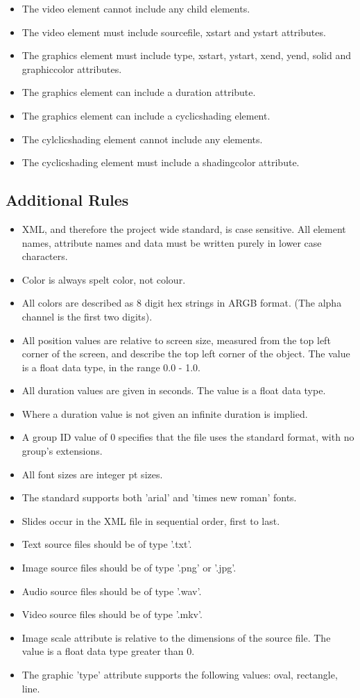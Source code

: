 \documentclass{article}
\begin{document}
\begin{itemize}
\item The video element cannot include any child elements.
\item The video element must include sourcefile, xstart and ystart attributes.
\item The graphics element must include type, xstart, ystart, xend, yend, solid and graphiccolor attributes.
\item The graphics element can include a duration attribute.
\item The graphics element can include a cyclicshading element.
\item The cylclicshading element cannot include any elements.
\item The cyclicshading element must include a shadingcolor attribute.

\end{itemize}

\clearpage

\subsection{Additional Rules}
\begin{itemize}
\item XML, and therefore the project wide standard, is case sensitive. All element names, attribute names and data must be written purely in lower case characters.
\item Color is always spelt color, not colour.
\item All colors are described as 8 digit hex strings in ARGB format. (The alpha channel is the first two digits).
\item All position values are relative to screen size, measured from the top left corner of the screen, and describe the top left corner of the object. The value is a float data type, in the range 0.0 - 1.0.
\item All duration values are given in seconds. The value is a float data type.
\item Where a duration value is not given an infinite duration is implied.
\item A group ID value of 0 specifies that the file uses the standard format, with no group's extensions.
\item All font sizes are integer pt sizes.
\item The standard supports both 'arial' and 'times new roman' fonts.
\item Slides occur in the XML file in sequential order, first to last.
\item Text source files should be of type '.txt'.
\item Image source files should be of type '.png' or '.jpg'.
\item Audio source files should be of type '.wav'. 
\item Video source files should be of type '.mkv'.
\item Image scale attribute is relative to the dimensions of the source file. The value is a float data type greater than 0.
\item The graphic 'type' attribute supports the following values: oval, rectangle, line.
\end{itemize}
\end{document}
